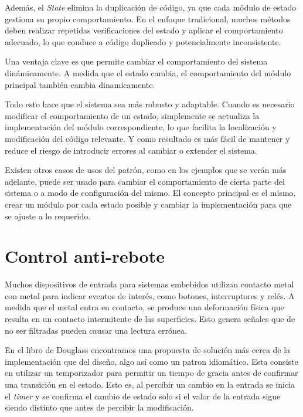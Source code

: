 Además, el \textit{State} elimina la duplicación de código, ya que cada módulo de estado gestiona su propio comportamiento. En el enfoque tradicional, muchos métodos deben realizar repetidas verificaciones del estado y aplicar el comportamiento adecuado, lo que conduce a código duplicado y potencialmente inconsistente.

Una ventaja clave es que permite cambiar el comportamiento del sistema dinámicamente. A medida que el estado cambia, el comportamiento del módulo principal también cambia dinamicamente. 

Todo esto hace que el sistema sea más robusto y adaptable. Cuando es necesario modificar el comportamiento de un estado, simplemente se actualiza la implementación del módulo correspondiente, lo que facilita la localización y modificación del código relevante. Y como resultado es más fácil de mantener y reduce el riesgo de introducir errores al cambiar o extender el sistema.

Existen otros casos de usos del patrón, como en los ejemplos que se verán más adelante, puede ser usado para cambiar el comportamiento de cierta parte del sistema o a modo de configuración del mismo. El concepto principal es el mismo, crear un módulo por cada estado posible y cambiar la implementación para que se ajuste a lo requerido.

\section{Control anti-rebote}
Muchos dispositivos de entrada para sistemas embebidos utilizan contacto metal con metal para indicar eventos de interés, como botones, interruptores y relés. A medida que el metal entra en contacto, se produce una deformación física que resulta en un contacto intermitente de las superficies. Esto genera señales que de no ser filtradas pueden causar una lectura errónea. 

En el libro de Douglass \cite{douglass} encontramos una propuesta de solución más cerca de la implementación que del diseño, algo así como un patron idiomático. Esta consiste en utilizar un temporizador para permitir un tiempo de gracia antes de confirmar una transición en el estado. Esto es, al percibir un cambio en la entrada se inicia el \textit{timer} y se confirma el cambio de estado solo si el valor de la entrada sigue siendo distinto que antes de percibir la modificación. 


